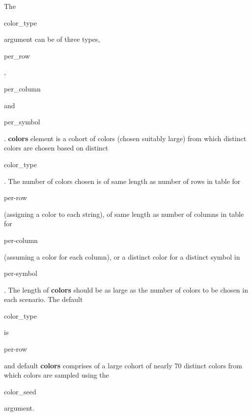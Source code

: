 \documentclass[12pt]{article}\usepackage[]{graphicx}\usepackage[usenames,dvipsnames]{color}
\begin{document}
The \begin{verb} color_type \end{verb} argument can be of three types, \begin{verb} per_row \end{verb}, \begin{verb} per_column \end{verb} and \begin{verb} per_symbol \end{verb}. \textbf{colors} element is a cohort of colors (chosen suitably large) from which distinct colors are chosen based on distinct \begin{verb} color_type \end{verb}. The number of colors chosen is of same length as number of rows in table for \begin{verb} per-row \end{verb} (assigning a color to each string), of same length as number of columns in table for \begin{verb} per-column \end{verb} (assuming a color for each column), or a distinct color for a distinct symbol in \begin{verb} per-symbol \end{verb}. The length of \textbf{colors} should be as large as the number of colors to be chosen in each scenario.
%
The default \begin{verb} color_type \end{verb} is \begin{verb} per-row \end{verb} and default \textbf{colors} comprises of a large cohort of nearly 70 distinct colors from which colors are sampled using the \begin{verb} color_seed \end{verb} argument.
\end{document}

